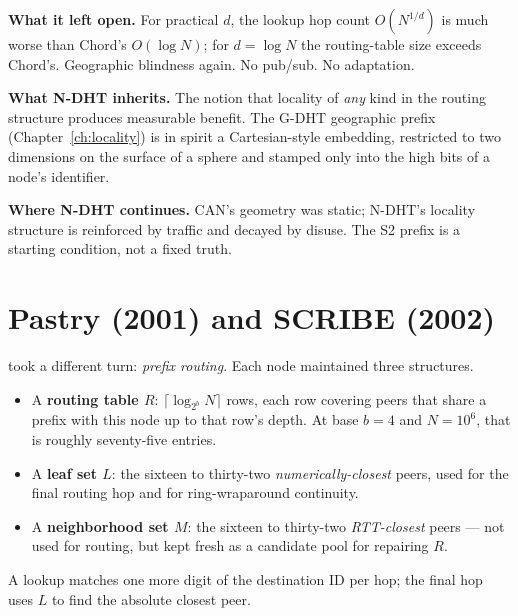 \documentclass[twoside,nobib]{tufte-book}
\newcommand{\NDHT}{N-DHT\xspace}
\newcommand{\GDHT}{G-DHT\xspace}
\begin{document}
\textbf{What it left open.} For practical $d$, the lookup hop count
$O(N^{1/d})$ is much worse than Chord's $O(\log N)$; for $d = \log
N$ the routing-table size exceeds Chord's. Geographic blindness
again. No pub/sub. No adaptation.

\textbf{What \NDHT inherits.} The notion that locality of
\emph{any} kind in the routing structure produces measurable
benefit. The \GDHT geographic prefix
(Chapter~\ref{ch:locality}) is in spirit a Cartesian-style
embedding, restricted to two dimensions on the surface of a sphere
and stamped only into the high bits of a node's identifier.

\textbf{Where \NDHT continues.} CAN's geometry was static; \NDHT's
locality structure is reinforced by traffic and decayed by disuse.
The S2 prefix is a starting condition, not a fixed truth.

\section{Pastry (2001) and SCRIBE (2002)}

 took a different turn:
\emph{prefix routing}. Each node maintained three structures.

\begin{itemize}\setlength\itemsep{0.2em}
  \item A \textbf{routing table $R$}: $\lceil \log_{2^b} N \rceil$
    rows, each row covering peers that share a prefix with this
    node up to that row's depth. At base $b = 4$ and $N = 10^6$,
    that is roughly seventy-five entries.
  \item A \textbf{leaf set $L$}: the sixteen to thirty-two
    \emph{numerically-closest} peers, used for the final routing
    hop and for ring-wraparound continuity.
  \item A \textbf{neighborhood set $M$}: the sixteen to thirty-two
    \emph{RTT-closest} peers --- not used for routing, but kept
    fresh as a candidate pool for repairing $R$.
\end{itemize}

A lookup matches one more digit of the destination ID per hop; the
final hop uses $L$ to find the absolute closest peer.
\end{document}
